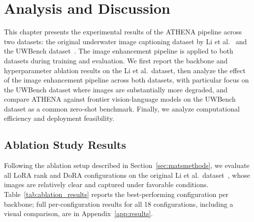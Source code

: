 \chapter{Analysis and Discussion} \label{sec:results}
This chapter presents the experimental results of the ATHENA pipeline across two datasets: the original underwater image captioning dataset by Li et al.~\cite{mainref} and the UWBench dataset~\cite{uwbench}. The image enhancement pipeline is applied to both datasets during training and evaluation. We first report the backbone and hyperparameter ablation results on the Li et al.\ dataset, then analyze the effect of the image enhancement pipeline across both datasets, with particular focus on the UWBench dataset where images are substantially more degraded, and compare ATHENA against frontier vision-language models on the UWBench dataset as a common zero-shot benchmark. Finally, we analyze computational efficiency and deployment feasibility.

\section{Ablation Study Results}

Following the ablation setup described in Section~\ref{sec:matsmethods}, we evaluate all LoRA rank and DoRA configurations on the original Li et al.\ dataset~\cite{mainref}, whose images are relatively clear and captured under favorable conditions. Table~\ref{tab:ablation_results} reports the best-performing configuration per backbone; full per-configuration results for all 18 configurations, including a visual comparison, are in Appendix~\ref{app:results}.

\begin{table}[h!]
\centering
\caption{Best configuration per backbone}
\label{tab:ablation_results}
\end{table}


